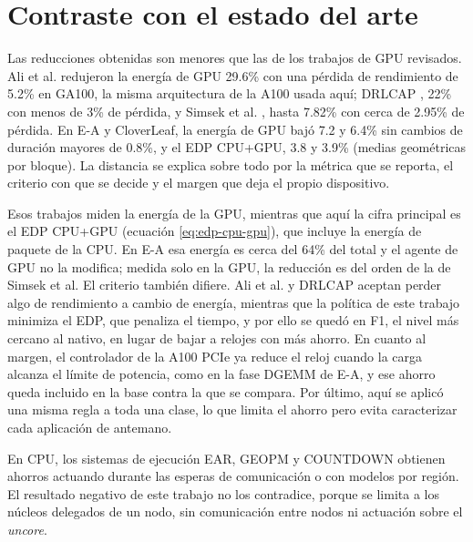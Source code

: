 \section{Contraste con el estado del arte}

Las reducciones obtenidas son menores que las de los trabajos de GPU revisados. Ali et al. \cite{Ali2023} redujeron la energía de GPU 29.6\% con una pérdida de rendimiento de 5.2\% en GA100, la misma arquitectura de la A100 usada aquí; DRLCAP \cite{Wang2024}, 22\% con menos de 3\% de pérdida, y Simsek et al. \cite{Simsek2024}, hasta 7.82\% con cerca de 2.95\% de pérdida. En E-A y CloverLeaf, la energía de GPU bajó 7.2 y 6.4\% sin cambios de duración mayores de 0.8\%, y el EDP CPU+GPU, 3.8 y 3.9\% (medias geométricas por bloque). La distancia se explica sobre todo por la métrica que se reporta, el criterio con que se decide y el margen que deja el propio dispositivo.

Esos trabajos miden la energía de la GPU, mientras que aquí la cifra principal es el EDP CPU+GPU (ecuación \eqref{eq:edp-cpu-gpu}), que incluye la energía de paquete de la CPU. En E-A esa energía es cerca del 64\% del total y el agente de GPU no la modifica; medida solo en la GPU, la reducción es del orden de la de Simsek et al. El criterio también difiere. Ali et al. y DRLCAP aceptan perder algo de rendimiento a cambio de energía, mientras que la política de este trabajo minimiza el EDP, que penaliza el tiempo, y por ello se quedó en F1, el nivel más cercano al nativo, en lugar de bajar a relojes con más ahorro. En cuanto al margen, el controlador de la A100 PCIe ya reduce el reloj cuando la carga alcanza el límite de potencia, como en la fase DGEMM de E-A, y ese ahorro queda incluido en la base contra la que se compara. Por último, aquí se aplicó una misma regla a toda una clase, lo que limita el ahorro pero evita caracterizar cada aplicación de antemano.

En CPU, los sistemas de ejecución EAR, GEOPM y COUNTDOWN \cite{Corbalan2020,Eastep2017,Cesarini2021} obtienen ahorros actuando durante las esperas de comunicación o con modelos por región. El resultado negativo de este trabajo no los contradice, porque se limita a los núcleos delegados de un nodo, sin comunicación entre nodos ni actuación sobre el \textit{uncore}.
